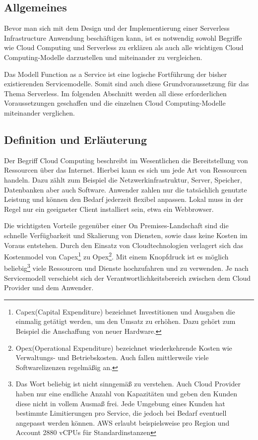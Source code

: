 \subsection{Allgemeines}

Bevor man sich mit dem Design und der Implementierung einer Serverless Infrastructure Anwendung beschäftigen kann, ist es notwendig sowohl Begriffe wie Cloud Computing und Serverless zu erklären als auch alle wichtigen Cloud Computing-Modelle darzustellen und miteinander zu vergleichen.

Das Modell Function as a Service ist eine logische Fortführung der bisher existierenden Servicemodelle.
Somit sind auch diese Grundvoraussetzung für das Thema Serverless.
Im folgenden Abschnitt werden all diese erforderlichen Voraussetzungen geschaffen und die einzelnen Cloud Computing-Modelle miteinander verglichen.


\subsection{Definition und Erläuterung}
Der Begriff Cloud Computing beschreibt im Wesentlichen die Bereitstellung von Ressourcen über das Internet.
Hierbei kann es sich um jede Art von Ressourcen handeln. Dazu zählt zum Beispiel die Netzwerkinfrastruktur, Server, Speicher, Datenbanken aber auch Software.
Anwender zahlen nur die tatsächlich genutzte Leistung und können den Bedarf jederzeit flexibel anpassen.
Lokal muss in der Regel nur ein geeigneter Client installiert sein, etwa ein Webbrowser.

Die wichtigsten Vorteile gegenüber einer On Premises-Landschaft sind die schnelle Verfügbarkeit und Skalierung von Diensten, sowie dass keine Kosten im Voraus entstehen.
Durch den Einsatz von Cloudtechnologien verlagert sich das Kostenmodel von Capex\footnote{ Capex(Capital Expenditure) bezeichnet Investitionen und Ausgaben die einmalig getätigt werden,
um den Umsatz zu erhöhen. Dazu gehört zum Beispiel die Anschaffung von neuer Hardware. } zu Opex\footnote{Opex(Operational Expenditure) bezeichnet wiederkehrende Kosten wie Verwaltungs- und Betriebskosten.
Auch fallen mittlerweile viele Softwarelizenzen regelmäßig an.}.
Mit einem Knopfdruck ist es möglich beliebig\footnote{Das Wort beliebig ist nicht sinngemäß zu verstehen.
Auch Cloud Provider haben nur eine endliche Anzahl von Kapazitäten und geben den Kunden diese nicht in vollem Ausmaß frei.
Jede Umgebung eines Kunden hat bestimmte Limitierungen pro Service, die jedoch bei Bedarf eventuell angepasst werden können.
AWS erlaubt beispielsweise pro Region und Account 2880 vCPUs für Standardinstanzen } viele Ressourcen und Dienste hochzufahren und zu verwenden.
Je nach Servicemodell verschiebt sich der Verantwortlichkeitsbereich zwischen dem Cloud Provider und dem Anwender.
\cite[]{CloudComputingDef}

